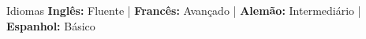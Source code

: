 \begin{rubric}{Idiomas}
  \entry* \textbf{Inglês:} Fluente | \textbf{Francês:} Avançado | \textbf{Alemão:} Intermediário | \textbf{Espanhol:} Básico
\end{rubric}
